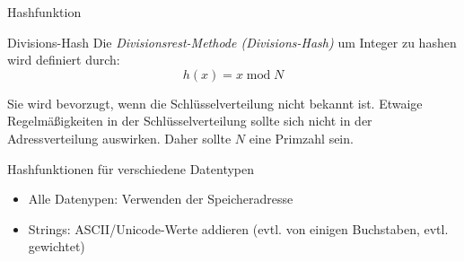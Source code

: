 \documentclass[german]{../spicker}
\begin{document}
\begin{defi}{Hashfunktion}
\begin{center}
    \end{center}
\end{defi}

\begin{example}{Divisions-Hash}
    Die \emph{Divisionsrest-Methode (Divisions-Hash)} um Integer zu hashen wird definiert durch:
    $$
        h(x) = x \operatorname{mod} N
    $$

    Sie wird bevorzugt, wenn die Schlüsselverteilung nicht bekannt ist.
    Etwaige Regelmäßigkeiten in der Schlüsselverteilung sollte sich nicht in der Adressverteilung auswirken. Daher sollte $N$ eine Primzahl sein.
\end{example}

\begin{example}{Hashfunktionen für verschiedene Datentypen}
    \begin{itemize}
        \item Alle Datenypen: Verwenden der Speicheradresse
        \item Strings: ASCII/Unicode-Werte addieren (evtl. von einigen Buchstaben, evtl. gewichtet)
    \end{itemize}
\end{example}
\end{document}
